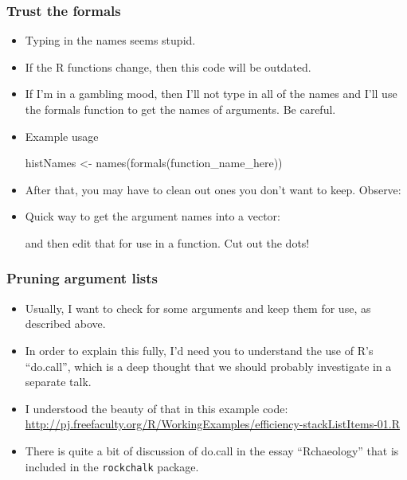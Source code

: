 \documentclass[11pt,english]{beamer}
\begin{document}
\begin{frame}
  \frametitle{Trust the formals}
  
   \begin{itemize}
     \item Typing in the names seems stupid.
     \item If the R functions change, then this code will be outdated.
     \item If I'm in a gambling mood, then I'll not type
       in all of the names and I'll use the formals function
       to get the names of arguments. Be careful.
    \item Example usage
   \begin{Sinput}
     histNames <- names(formals(function_name_here))
   \end{Sinput}

  \item
    After that, you may have to clean out ones you
    don't want to keep. Observe:

  \item Quick way to get the argument names into a vector:
    

   and then edit that for use in a function. Cut out the dots!   
 \end{itemize}
\end{frame}


\begin{frame}
  \frametitle{Pruning argument lists}
\begin{itemize}  
  \item Usually, I want to check for some arguments and
    keep them for use, as described above.
    
  \item In order to explain this fully, I'd need you to understand the
    use of R's ``do.call'', which is a deep thought that we should
    probably investigate in a separate talk.
    
  \item I understood the beauty of that in this example code:
    \url{http://pj.freefaculty.org/R/WorkingExamples/efficiency-stackListItems-01.R}

  \item There is quite a bit of discussion of do.call in the essay
    ``Rchaeology'' that is included in the \texttt{rockchalk} package.
    
  \end{itemize}
\end{frame}
\end{document}
